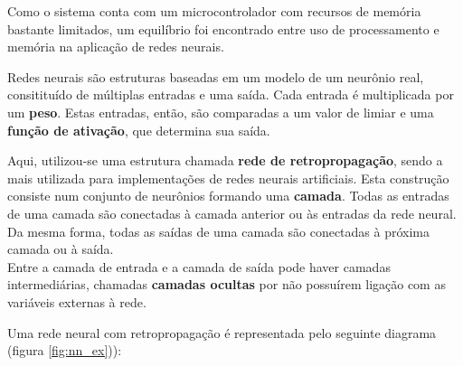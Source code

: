 \documentclass[10pt,a4paper]{article}
\begin{document}
\begin{multicols*}{2}
Como o sistema conta com um microcontrolador com recursos de memória bastante limitados, um equilíbrio foi encontrado entre uso de processamento e memória na aplicação de redes neurais.

Redes neurais são estruturas baseadas em um modelo de um neurônio real, consitituído de múltiplas entradas e uma saída. Cada entrada é multiplicada por um \textbf{peso}. Estas entradas, então, são comparadas a um valor de limiar e uma \textbf{função de ativação}, que determina sua saída.

Aqui, utilizou-se uma estrutura chamada \textbf{rede de retropropagação}, sendo a mais utilizada para implementações de redes neurais artificiais. Esta construção consiste num conjunto de neurônios formando uma \textbf{camada}. Todas as entradas de uma camada são conectadas à camada anterior ou às entradas da rede neural. Da mesma forma, todas as saídas de uma camada são conectadas à próxima camada ou à saída.
\\ Entre a camada de entrada e a camada de saída pode haver camadas intermediárias, chamadas \textbf{camadas ocultas} por não possuírem ligação com as variáveis externas à rede.

Uma rede neural com retropropagação é representada pelo seguinte diagrama (figura \ref{fig:nn_ex})):
\def\layersep{0.1*\textwidth}
\begin{figure}[H]
\centering	
{}
\end{figure}
\end{multicols*}
\end{document}
